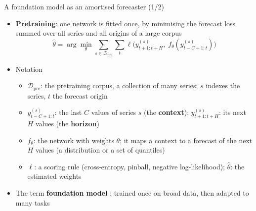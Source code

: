\begin{frame}{A foundation model as an amortised forecaster (1/2)}
\itemsize{\small}
\begin{itemize}
    \item \textbf{Pretraining}: one network is fitted once, by minimising the forecast loss summed over all series and all origins of a large corpus \[ \hat\theta = \arg\min_\theta \sum_{s \in \mathcal D_{\mathrm{pre}}}\sum_t \ell\big(y^{(s)}_{t+1:t+H},\; f_\theta(y^{(s)}_{t-C+1:t})\big) \]
    \item Notation
    \begin{itemize}
        \item $\mathcal D_{\mathrm{pre}}$: the pretraining corpus, a collection of many series; $s$ indexes the series, $t$ the forecast origin
        \item $y^{(s)}_{t-C+1:t}$: the last $C$ values of series $s$ (the \textbf{context}); $y^{(s)}_{t+1:t+H}$: its next $H$ values (the \textbf{horizon})
        \item $f_\theta$: the network with weights $\theta$; it maps a context to a forecast of the next $H$ values (a distribution or a set of quantiles)
        \item $\ell$: a scoring rule (cross-entropy, pinball, negative log-likelihood); $\hat\theta$: the estimated weights
    \end{itemize}
    \item The term \textbf{foundation model} : trained once on broad data, then adapted to many tasks
\end{itemize}
\end{frame}

